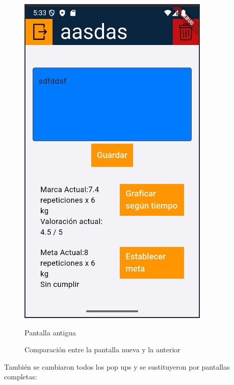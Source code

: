 \begin{figure}[h!]
\begin{minipage}[b]{0.45\textwidth}
    \includegraphics[width=\textwidth]{fotos/ejerciciosVieja.png}
    \caption{Pantalla antigua}
    \label{fig:pantalla_vieja}
  \end{minipage}
  \caption{Comparación entre la pantalla nueva y la anterior}
  \label{fig:comparacion_pantallas}
\end{figure}

También se cambiaron todos los pop ups y se sustituyeron por pantallas completas:

